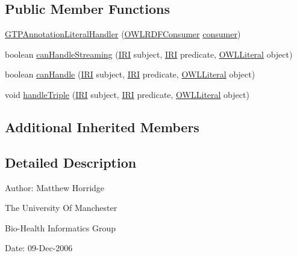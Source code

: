 \subsection*{Public Member Functions}
\begin{DoxyCompactItemize}
\item 
\hyperlink{classorg_1_1coode_1_1owlapi_1_1rdfxml_1_1parser_1_1_g_t_p_annotation_literal_handler_af5f9bdaf07dca2bc54b7f12aa8e243b2}{G\-T\-P\-Annotation\-Literal\-Handler} (\hyperlink{classorg_1_1coode_1_1owlapi_1_1rdfxml_1_1parser_1_1_o_w_l_r_d_f_consumer}{O\-W\-L\-R\-D\-F\-Consumer} \hyperlink{classorg_1_1coode_1_1owlapi_1_1rdfxml_1_1parser_1_1_abstract_triple_handler_a4ccf4d898ff01eb1cadfa04b23d54e9c}{consumer})
\item 
boolean \hyperlink{classorg_1_1coode_1_1owlapi_1_1rdfxml_1_1parser_1_1_g_t_p_annotation_literal_handler_a8d8fccd5d3a93543eb372660b85fb610}{can\-Handle\-Streaming} (\hyperlink{classorg_1_1semanticweb_1_1owlapi_1_1model_1_1_i_r_i}{I\-R\-I} subject, \hyperlink{classorg_1_1semanticweb_1_1owlapi_1_1model_1_1_i_r_i}{I\-R\-I} predicate, \hyperlink{interfaceorg_1_1semanticweb_1_1owlapi_1_1model_1_1_o_w_l_literal}{O\-W\-L\-Literal} object)
\item 
boolean \hyperlink{classorg_1_1coode_1_1owlapi_1_1rdfxml_1_1parser_1_1_g_t_p_annotation_literal_handler_a73dcd4c06a8ffb12895789cc060ae958}{can\-Handle} (\hyperlink{classorg_1_1semanticweb_1_1owlapi_1_1model_1_1_i_r_i}{I\-R\-I} subject, \hyperlink{classorg_1_1semanticweb_1_1owlapi_1_1model_1_1_i_r_i}{I\-R\-I} predicate, \hyperlink{interfaceorg_1_1semanticweb_1_1owlapi_1_1model_1_1_o_w_l_literal}{O\-W\-L\-Literal} object)
\item 
void \hyperlink{classorg_1_1coode_1_1owlapi_1_1rdfxml_1_1parser_1_1_g_t_p_annotation_literal_handler_a4b2860b1625668db03b0ad6ce1cf7130}{handle\-Triple} (\hyperlink{classorg_1_1semanticweb_1_1owlapi_1_1model_1_1_i_r_i}{I\-R\-I} subject, \hyperlink{classorg_1_1semanticweb_1_1owlapi_1_1model_1_1_i_r_i}{I\-R\-I} predicate, \hyperlink{interfaceorg_1_1semanticweb_1_1owlapi_1_1model_1_1_o_w_l_literal}{O\-W\-L\-Literal} object)
\end{DoxyCompactItemize}
\subsection*{Additional Inherited Members}


\subsection{Detailed Description}
Author\-: Matthew Horridge\par
 The University Of Manchester\par
 Bio-\/\-Health Informatics Group\par
 Date\-: 09-\/\-Dec-\/2006\par
\par
 

